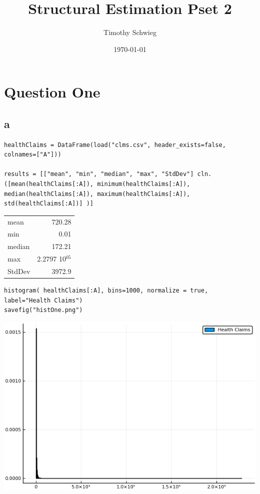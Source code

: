\documentclass[12pt, letterpaper]{paper}
\author{Timothy Schwieg}
\date{\today}
\title{Structural Estimation Pset 2}
\begin{document}
\maketitle

\section{Question One}
\label{sec:orgdb13621}
\subsection{a}
\label{sec:org3ff56b5}
\begin{verbatim}
healthClaims = DataFrame(load("clms.csv", header_exists=false, colnames=["A"]))

results = [["mean", "min", "median", "max", "StdDev"] cln.([mean(healthClaims[:A]), minimum(healthClaims[:A]), median(healthClaims[:A]), maximum(healthClaims[:A]), std(healthClaims[:A])] )]
\end{verbatim}

\begin{center}
\begin{tabular}{lr}
mean & 720.28\\
min & 0.01\\
median & 172.21\\
max & 2.2797 \texttimes{} 10\(^{\text{05}}\)\\
StdDev & 3972.9\\
\end{tabular}
\end{center}

\begin{verbatim}
histogram( healthClaims[:A], bins=1000, normalize = true, label="Health Claims")
savefig("histOne.png")

\end{verbatim}

\begin{center}
\includegraphics[width=.9\linewidth]{histOne.png}
\end{center}
\end{document}
